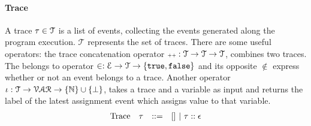\paragraph{Trace}
A trace $\mathtt{\tau} \in \mathcal{T} $ is a list of events, 
collecting the events generated along the program execution. $\mathcal{T} $ represents the set of traces. There are some useful operators: the trace concatenation operator ${\scriptscriptstyle ++}: \mathcal{T} \to \mathcal{T} \to \mathcal{T}$, combines two traces.
The belongs to operator $\in : \mathcal{E} \to \mathcal{T} \to \{\mathtt{true}, \mathtt{false} \} $ and its opposite $\not\in$
express whether or not an event belongs to a trace.
Another operator $\iota : \mathcal{T} \to \mathcal{VAR} \to \{\mathbb{N}\}\cup \{\bot\}$,
takes a trace and a variable as input and returns the label of the latest assignment event which assigns value to that variable. 
\[
\begin{array}{llll}
\mbox{Trace} & \mathtt{\tau}
& ::= & [] ~|~ \mathtt{\tau} :: \mathtt{\epsilon}
\end{array}
\]

